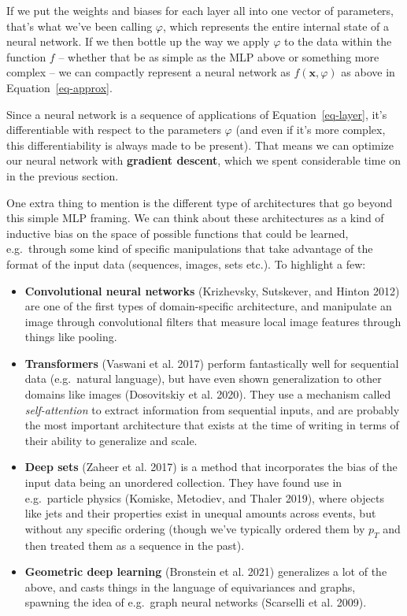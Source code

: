 \documentclass[
  11pt,
  numbers=noendperiod]{book}
\begin{document}
If we put the weights and biases for each layer all into one vector of
parameters, that's what we've been calling \(\varphi\), which represents
the entire internal state of a neural network. If we then bottle up the
way we apply \(\varphi\) to the data within the function \(f\) --
whether that be as simple as the MLP above or something more complex --
we can compactly represent a neural network as
\(f(\mathbf{x}, \varphi)\) as above in Equation~\ref{eq-approx}.

Since a neural network is a sequence of applications of
Equation~\ref{eq-layer}, it's differentiable with respect to the
parameters \(\varphi\) (and even if it's more complex, this
differentiability is always made to be present). That means we can
optimize our neural network with \textbf{gradient descent}, which we
spent considerable time on in the previous section.

One extra thing to mention is the different type of architectures that
go beyond this simple MLP framing. We can think about these
architectures as a kind of inductive bias on the space of possible
functions that could be learned, e.g.~through some kind of specific
manipulations that take advantage of the format of the input data
(sequences, images, sets etc.). To highlight a few:

\begin{itemize}
\item
  \textbf{Convolutional neural networks} (Krizhevsky, Sutskever, and
  Hinton 2012) are one of the first types of domain-specific
  architecture, and manipulate an image through convolutional filters
  that measure local image features through things like pooling.
\item
  \textbf{Transformers} (Vaswani et al. 2017) perform fantastically well
  for sequential data (e.g.~natural language), but have even shown
  generalization to other domains like images (Dosovitskiy et al. 2020).
  They use a mechanism called \emph{self-attention} to extract
  information from sequential inputs, and are probably the most
  important architecture that exists at the time of writing in terms of
  their ability to generalize and scale.
\item
  \textbf{Deep sets} (Zaheer et al. 2017) is a method that incorporates
  the bias of the input data being an unordered collection. They have
  found use in e.g.~particle physics (Komiske, Metodiev, and Thaler
  2019), where objects like jets and their properties exist in unequal
  amounts across events, but without any specific ordering (though we've
  typically ordered them by \(p_T\) and then treated them as a sequence
  in the past).
\item
  \textbf{Geometric deep learning} (Bronstein et al. 2021) generalizes a
  lot of the above, and casts things in the language of equivariances
  and graphs, spawning the idea of e.g.~graph neural networks (Scarselli
  et al. 2009).
\end{itemize}
\end{document}
